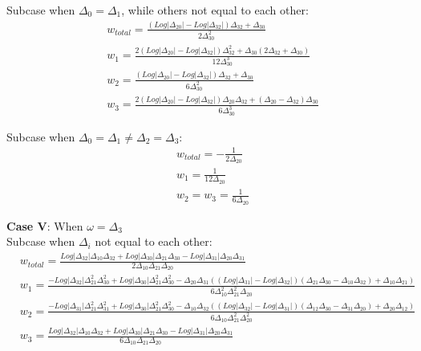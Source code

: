 \documentclass[10pt]{article}
\begin{document}
Subcase when $\Delta_0=\Delta_1$, while others not equal to each other:\\

\begin{subequations}\label{wtt11}
\begin{align}
&w_{total}=\frac{(Log|\Delta_{20}|-Log|\Delta_{32}|)\Delta_{32}+\Delta_{30}}{2\Delta_{30}^2}\\
&w_{1}=\frac{2(Log|\Delta_{20}|-Log|\Delta_{32}|)\Delta_{32}^2+\Delta_{30}(2\Delta_{32}+\Delta_{30})}{12\Delta_{30}^3}\\
&w_{2}=\frac{(Log|\Delta_{20}|-Log|\Delta_{32}|)\Delta_{32}+\Delta_{30}}{6\Delta_{30}^2}\\
&w_{3}=\frac{2(Log|\Delta_{20}|-Log|\Delta_{32}|)\Delta_{20}\Delta_{32}+(\Delta_{20}-\Delta_{32})\Delta_{30}}{6\Delta_{30}^3}
\end{align}
\end{subequations}

Subcase when $\Delta_0=\Delta_1\neq\Delta_2=\Delta_3$:
\begin{subequations}\label{wtt12}
\begin{align}
&w_{total}=-\frac{1}{2\Delta_{20}}\\
&w_{1}=\frac{1}{12\Delta_{20}}\\
&w_2=w_3=\frac{1}{6\Delta_{20}}
\end{align}
\end{subequations}

\textbf{Case V}: When $\omega=\Delta_{3}$\\

Subcase when $\Delta_i$ not equal to each other:\\

\begin{subequations}\label{wtt13}
\begin{align}
&w_{total}=\frac{Log|\Delta_{32}|\Delta_{10}\Delta_{32}+Log|\Delta_{30}|\Delta_{21}\Delta_{30}-Log|\Delta_{31}|\Delta_{20}\Delta_{31}}{2\Delta_{10}\Delta_{21}\Delta_{20}}\\
&w_{1}=\frac{-Log|\Delta_{32}|\Delta_{21}^2\Delta_{30}^2+Log|\Delta_{30}|\Delta_{21}^2\Delta_{30}^2-\Delta_{20}\Delta_{31}((Log|\Delta_{31}|-Log|\Delta_{32}|)(\Delta_{21}\Delta_{30}-\Delta_{10}\Delta_{32})+\Delta_{10}\Delta_{21})}{6\Delta_{10}^2\Delta_{21}^2\Delta_{20}}\\
&w_{2}=\frac{-Log|\Delta_{31}|\Delta_{21}^2\Delta_{31}^2+Log|\Delta_{30}|\Delta_{21}^2\Delta_{30}^2-\Delta_{10}\Delta_{32}((Log|\Delta_{32}|-Log|\Delta_{31}|)(\Delta_{12}\Delta_{30}-\Delta_{31}\Delta_{20})+\Delta_{20}\Delta_{12})}{6\Delta_{10}\Delta_{21}^2\Delta_{20}^2}\\
&w_{3}=\frac{Log|\Delta_{32}|\Delta_{10}\Delta_{32}+Log|\Delta_{30}|\Delta_{21}\Delta_{30}-Log|\Delta_{31}|\Delta_{20}\Delta_{31}}{6\Delta_{10}\Delta_{21}\Delta_{20}}
\end{align}
\end{subequations}
\end{document}

